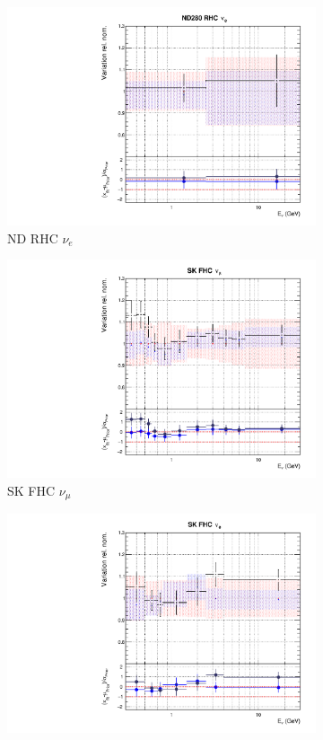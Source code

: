 \begin{figure}[t]
\begin{subfigure}{0.24\textwidth}
  \includegraphics[width=0.95\linewidth]{figs/rhcmpdat28flux_7}
  \caption{ND RHC $\nu_e$}
  \label{fig:}
\end{subfigure}
\begin{subfigure}{0.24\textwidth}
  \centering
  \includegraphics[width=0.95\linewidth]{figs/rhcmpdat28flux_8}
  \caption{SK FHC $\nu_{\mu}$}
  \label{fig:}
\end{subfigure}
\begin{subfigure}{0.24\textwidth}
  \centering
  \includegraphics[width=0.95\linewidth]{figs/rhcmpdat28flux_9}

\end{subfigure}
\end{figure}
